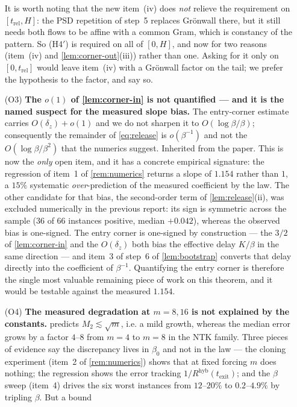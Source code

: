 \documentclass[11pt]{article}
\theoremstyle{definition}
\theoremstyle{remark}
\newcommand{\hyb}{\mathrm{hyb}}
\newcommand{\texit}{t_{\mathrm{exit}}}
\newcommand{\trel}{t_{\mathrm{rel}}}
\begin{document}
\begin{enumerate}
It is worth noting that the new item~(iv) does \emph{not} relieve the
requirement on $[\trel,H]$: the PSD repetition of step~5 replaces Gr\"onwall
there, but it still needs both flows to be affine with a common Gram, which is
constancy of the pattern. So (H4$'$) is required on all of $[0,H]$, and now for
two reasons (item~(iv) and \cref{lem:corner-out}(iii)) rather than one. Asking
for it only on $[0,\trel]$ would leave item~(iv) with a Gr\"onwall factor on the
tail; we prefer the hypothesis to the factor, and say so.
\item[(O3)] \textbf{The $o(1)$ of \cref{lem:corner-in} is not quantified ---
and it is the named suspect for the measured slope bias.} The entry-corner
estimate carries $O(\delta_z)+o(1)$ and we do not sharpen it to
$O(\log\beta/\beta)$; consequently the remainder of \eqref{eq:release} is
$o(\beta^{-1})$ and not the $O(\log\beta/\beta^2)$ that the numerics suggest.
Inherited from the paper. This is now the \emph{only} open item, and it has a
concrete empirical signature: the regression of item~1 of \cref{rem:numerics}
returns a slope of $1.154$ rather than $1$, a $15\%$ systematic
\emph{over}-prediction of the measured coefficient by the law. The other
candidate for that bias, the second-order term of \cref{lem:release}(ii), was
excluded numerically in the previous report: its sign is symmetric across the
sample ($36$ of $66$ instances positive, median $+0.042$), whereas the observed
bias is one-signed. The entry corner is one-signed by construction --- the
$3/2$ of \cref{lem:corner-in} and the $O(\delta_z)$ both bias the effective delay
$K/\beta$ in the same direction --- and item~3 of step~6 of \cref{lem:bootstrap}
converts that delay directly into the coefficient of $\beta^{-1}$. Quantifying
the entry corner is therefore the single most valuable remaining piece of work on
this theorem, and it would be testable against the measured $1.154$.
\item[(O4)] \textbf{The measured degradation at $m=8,16$ is not explained by the
constants.}  predicts $M_2\lesssim\sqrt m$, i.e. a mild growth,
whereas the median error grows by a factor $4$--$8$ from $m=4$ to $m=8$ in the
NTK family. Three pieces of evidence say the discrepancy lives in $\beta_0$ and
not in the law --- the cloning experiment (item~2 of \cref{rem:numerics}) shows
that at fixed forcing $m$ does nothing; the regression shows the error tracking
$1/R^{\hyb}(\texit)$; and the $\beta$ sweep (item~4) drives the six worst
instances from $12$--$20\%$ to $0.2$--$4.9\%$ by tripling $\beta$. But a bound

\end{enumerate}
\end{document}
